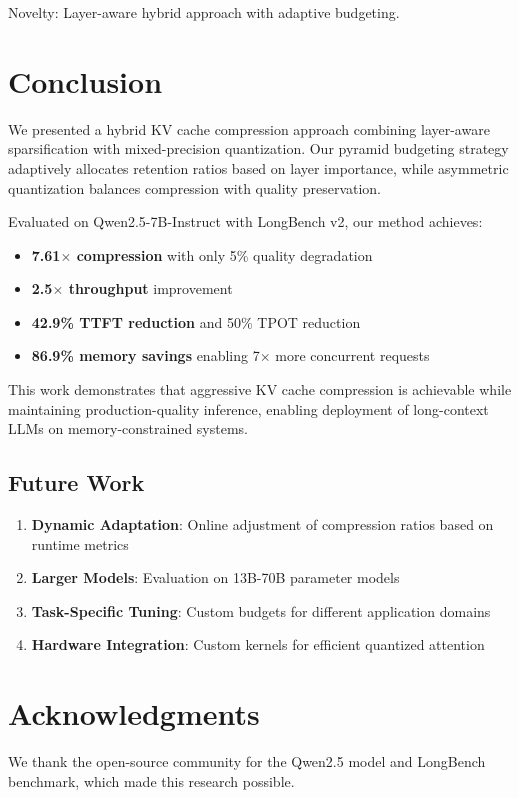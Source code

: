 \documentclass{article}
\begin{document}
Novelty: Layer-aware hybrid approach with adaptive budgeting.

\section{Conclusion}

We presented a hybrid KV cache compression approach combining layer-aware sparsification with mixed-precision quantization. Our pyramid budgeting strategy adaptively allocates retention ratios based on layer importance, while asymmetric quantization balances compression with quality preservation.

Evaluated on Qwen2.5-7B-Instruct with LongBench v2, our method achieves:
\begin{itemize}
\item \textbf{7.61$\times$ compression} with only 5\% quality degradation
\item \textbf{2.5$\times$ throughput} improvement
\item \textbf{42.9\% TTFT reduction} and 50\% TPOT reduction
\item \textbf{86.9\% memory savings} enabling 7$\times$ more concurrent requests
\end{itemize}

This work demonstrates that aggressive KV cache compression is achievable while maintaining production-quality inference, enabling deployment of long-context LLMs on memory-constrained systems.

\subsection{Future Work}

\begin{enumerate}
\item \textbf{Dynamic Adaptation}: Online adjustment of compression ratios based on runtime metrics
\item \textbf{Larger Models}: Evaluation on 13B-70B parameter models
\item \textbf{Task-Specific Tuning}: Custom budgets for different application domains
\item \textbf{Hardware Integration}: Custom kernels for efficient quantized attention
\end{enumerate}

\section*{Acknowledgments}

We thank the open-source community for the Qwen2.5 model and LongBench benchmark, which made this research possible.



\end{document}
